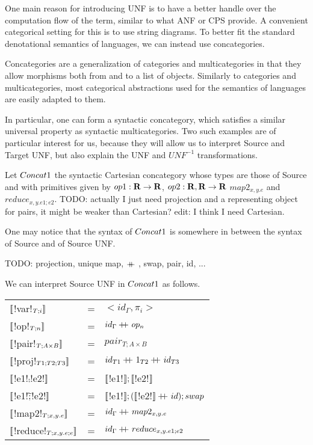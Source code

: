 One main reason for introducing UNF is to have a better handle over
the computation flow of the term, similar to what ANF or CPS provide. 
A convenient categorical setting for this is to use string diagrams.
To better fit the standard denotational semantics of languages, 
we can instead use concategories. 

Concategories are a generalization of categories and multicategories in that 
they allow morphisms both from and to a list of objects. 
Similarly to categories and multicategories, 
most categorical abstractions used for the semantics of languages are easily adapted to them.

In particular, one can form a syntactic concategory, 
which satisfies a similar universal property as syntactic multicategories.
Two such examples are of particular interest for us, 
because they will allow us to interpret Source and Target UNF, 
but also explain the UNF and $UNF^{-1}$ transformations.

\begin{definition}[$\ConcatS$]
Let $\ConcatS$ the syntactic Cartesian concategory whose types are those of Source and 
with primitives given by $op1: \mathbf{R} \to \mathbf{R}$, $op2: \mathbf{R},\mathbf{R} \to \mathbf{R}$ $map2_{x,y.e}$
and $reduce_{x,y.e1;e2}$.
TODO: actually I just need projection and a representing object for pairs, it might be weaker than Cartesian? edit: I think I need Cartesian.
\end{definition}

One may notice that the syntax of $\ConcatS$ is somewhere in between the syntax of Source and of Source UNF.

\begin{notation}
    TODO: projection, unique map, $+\kern-1.3ex+\kern0.8ex$, swap, pair, id, ...
\end{notation}

We can interpret Source UNF in $\ConcatS$ as follows.

\begin{tabular}{l c l}
   $\llbracket$!var!$_{T;i} \rrbracket$ &=& $<id_\Gamma,\pi_i>$ \\
   $\llbracket$!op!$_{T;n} \rrbracket$ &=& $id_\Gamma+\kern-1.3ex+\kern0.8ex op_n$\\
   $\llbracket$!pair!$_{T;A\times B} \rrbracket$ &=& $pair_{T;A\times B}$ \\
   $\llbracket$!proj!$_{T1;T2;T3} \rrbracket$ &=& $id_{T1}+\kern-1.3ex+\kern0.8ex 1_{T2}+\kern-1.3ex+\kern0.8ex id_{T3}$\\
   $\llbracket$!e1!$\comp$!e2!$\rrbracket$  &=& $\llbracket$!e1!$\rrbracket ; \llbracket$!e2!$\rrbracket$ \\
   $\llbracket$!e1!$\widetilde{;}$!e2!$\rrbracket$ &=& $\llbracket$!e1!$\rrbracket ; (\llbracket$!e2!$\rrbracket+\kern-1.3ex+\kern0.8ex id ); swap$ \\
   $\llbracket$!map2!$_{T;x,y.e}\rrbracket$  &=& $id_\Gamma+\kern-1.3ex+\kern0.8ex map2_{x,y.e}$ \\
   $\llbracket$!reduce!$_{T;x,y.e;e}\rrbracket$ &=& $id_\Gamma+\kern-1.3ex+\kern0.8ex reduce_{x,y.e1;e2}$ \\
\end{tabular}

